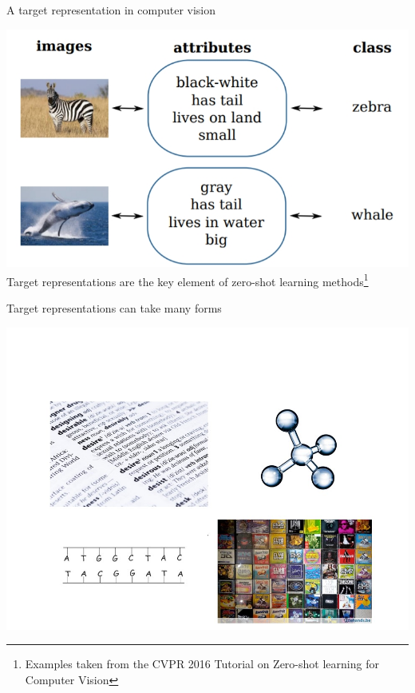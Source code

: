 \documentclass[]{beamer}
\begin{document}
\begin{frame}{A target representation in computer vision}

\begin{center}
\includegraphics[scale=0.4]{Figures/semanticclasses} \\
Target representations are the key element of zero-shot learning methods\footnote{Examples taken from the CVPR 2016 Tutorial on Zero-shot learning for Computer Vision} 
\end{center}

\end{frame}

\begin{frame}{Target representations can take many forms}

\begin{center}
\includegraphics[width=\textwidth,trim = 0 0 0 90,clip]{Figures/representations}
\end{center}

\end{frame}
\end{document}
